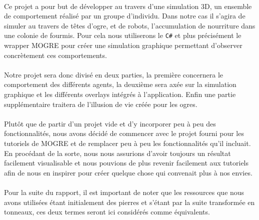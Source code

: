 \paragraph{}
Ce projet a pour but de développer au travers d'une simulation 3D, un
ensemble de comportement réalisé par un groupe d'individu. Dans notre cas il
s'agira de simuler au travers de têtes d'ogre, et de robots, l'accumulation de
nourriture dans une colonie de fourmis. Pour cela nous utiliserons le
\verb!C#! et plus précisément le wrapper MOGRE pour créer une simulation
graphique permettant d'observer concrètement ces comportements.

\paragraph{}

Notre projet sera donc divisé en deux parties, la première concernera 
le comportement des différents agents, la deuxième sera axée sur la simulation
graphique et les différents overlays intégrés à l'application. Enfin une partie
supplémentaire traitera de l'illusion de vie créée pour les ogres.

\paragraph{}
Plutôt que de partir d'un projet vide et d'y incorporer peu à peu des
fonctionnalités, nous avons décidé de commencer avec le projet fourni pour
les tutoriels de MOGRE et de remplacer peu à peu les fonctionnalités qu'il
incluait. En procédant de la sorte, nous nous assurions d'avoir toujours un
résultat facilement visualisable et nous pouvions de plus revenir facilement aux
tutoriels afin de nous en inspirer pour créer quelque chose qui convenait plus à
nos envies.

\paragraph{}
Pour la suite du rapport, il est important de noter que les
ressources que nous avons utilisées étant initialement des pierres et s'étant
par la suite transformée en tonneaux, ces deux termes seront ici considérés
comme équivalents.
